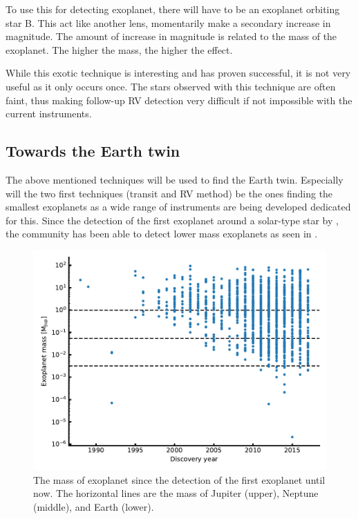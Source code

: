 To use this for detecting exoplanet, there will have to be an exoplanet orbiting star B. This act
like another lens, momentarily make a secondary increase in magnitude. The amount of increase in
magnitude is related to the mass of the exoplanet. The higher the mass, the higher the effect.

While this exotic technique is interesting and has proven successful, it is not very useful as it
only occurs once. The stars observed with this technique are often faint, thus making follow-up RV
detection very difficult if not impossible with the current instruments.


\subsection{Towards the Earth twin}

The above mentioned techniques will be used to find the Earth twin. Especially will the two first
techniques (transit and RV method) be the ones finding the smallest exoplanets as a wide range of
instruments are being developed dedicated for this. Since the detection of the first exoplanet around a solar-type star by \citet{Mayor1995}, the
community has been able to detect lower mass exoplanets as seen in .

\begin{figure}[htpb!]
    \centering
    \includegraphics[width=0.8\linewidth]{figures/exoplanetMass.pdf}
    \caption{The mass of exoplanet since the detection of the first exoplanet until now. The
             horizontal lines are the mass of Jupiter (upper), Neptune (middle), and Earth (lower).}
    \label{fig:exoplanetMass}
\end{figure}

